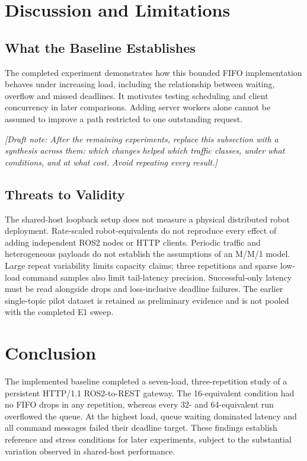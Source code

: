 \documentclass[10pt,a4paper,twocolumn,twoside]{tau-class/tau}
\newcommand{\draftnote}[1]{\par\noindent\textit{[Draft note: #1]}\par}
\begin{document}
\section{Discussion and Limitations}
\label{sec:discussion}

\subsection{What the Baseline Establishes}
The completed experiment demonstrates how this bounded FIFO implementation
behaves under increasing load, including the relationship between waiting,
overflow and missed deadlines. It motivates testing scheduling and client
concurrency in later comparisons. Adding server workers alone cannot be
assumed to improve a path restricted to one outstanding request.

\draftnote{After the remaining experiments, replace this subsection with
a synthesis across them: which changes helped which traffic classes,
under what conditions, and at what cost. Avoid repeating every result.}

\subsection{Threats to Validity}
The shared-host loopback setup does not measure a physical distributed
robot deployment. Rate-scaled robot-equivalents do not reproduce every
effect of adding independent ROS2 nodes or HTTP clients. Periodic traffic
and heterogeneous payloads do not establish the assumptions of an M/M/1
model. Large repeat variability limits capacity claims; three repetitions
and sparse low-load command samples also limit tail-latency precision.
Successful-only latency must be read alongside drops and loss-inclusive
deadline failures. The earlier single-topic pilot dataset is retained as
preliminary evidence and is not pooled with the completed E1 sweep.

\section{Conclusion}
\label{sec:conclusion}

The implemented baseline completed a seven-load, three-repetition study
of a persistent HTTP/1.1 ROS2-to-REST gateway. The 16-equivalent condition
had no FIFO drops in any repetition, whereas every 32- and 64-equivalent
run overflowed the queue. At the highest load, queue waiting dominated
latency and all command messages failed their deadline target. These
findings establish reference and stress conditions for later experiments,
subject to the substantial variation observed in shared-host performance.
\end{document}

